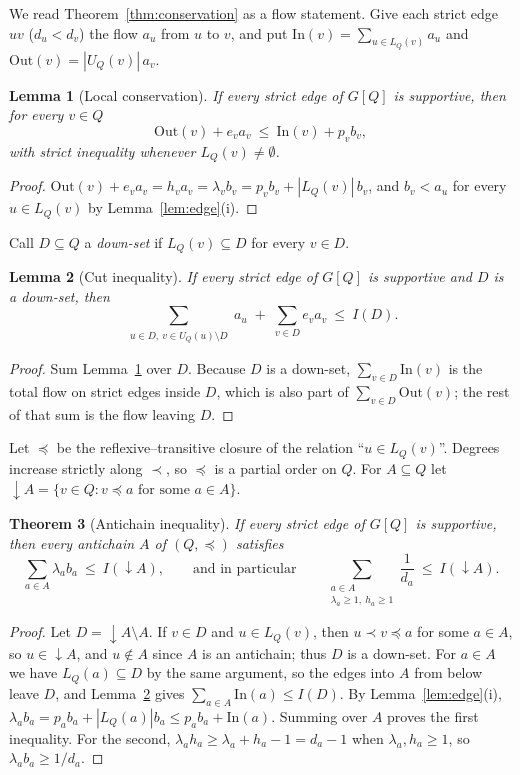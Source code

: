 \documentclass[11pt]{amsart}
\newtheorem{theorem}{Theorem}[section]
\newtheorem{lemma}[theorem]{Lemma}
\theoremstyle{definition}
\begin{document}
We read Theorem~\ref{thm:conservation} as a flow statement. Give each strict edge $uv$ ($d_u<d_v$) the flow $a_u$ from
$u$ to $v$, and put $\mathrm{In}(v)=\sum_{u\in L_Q(v)}a_u$ and $\mathrm{Out}(v)=|U_Q(v)|\,a_v$.

\begin{lemma}[Local conservation]\label{lem:flow}
If every strict edge of $G[Q]$ is supportive, then for every $v\in Q$
\[
\mathrm{Out}(v)+e_va_v\ \le\ \mathrm{In}(v)+p_vb_v ,
\]
with strict inequality whenever $L_Q(v)\ne\emptyset$.
\end{lemma}

\begin{proof}
$\mathrm{Out}(v)+e_va_v=h_va_v=\lambda_vb_v=p_vb_v+|L_Q(v)|\,b_v$, and $b_v<a_u$ for every $u\in L_Q(v)$ by
Lemma~\ref{lem:edge}(i).
\end{proof}

Call $D\subseteq Q$ a \emph{down-set} if $L_Q(v)\subseteq D$ for every $v\in D$.

\begin{lemma}[Cut inequality]\label{lem:cut}
If every strict edge of $G[Q]$ is supportive and $D$ is a down-set, then
\[
\sum_{\substack{u\in D,\ v\in U_Q(u)\setminus D}}a_u\;+\;\sum_{v\in D}e_va_v\ \le\ I(D).
\]
\end{lemma}

\begin{proof}
Sum Lemma~\ref{lem:flow} over $D$. Because $D$ is a down-set, $\sum_{v\in D}\mathrm{In}(v)$ is the total flow on
strict edges inside $D$, which is also part of $\sum_{v\in D}\mathrm{Out}(v)$; the rest of that sum is the flow leaving $D$.
\end{proof}

Let $\preceq$ be the reflexive--transitive closure of the relation ``$u\in L_Q(v)$''. Degrees increase strictly along
$\prec$, so $\preceq$ is a partial order on $Q$. For $A\subseteq Q$ let $\downarrow\!A=\{v\in Q: v\preceq a\text{ for some }a\in A\}$.

\begin{theorem}[Antichain inequality]\label{thm:antichain}
If every strict edge of $G[Q]$ is supportive, then every antichain $A$ of $(Q,\preceq)$ satisfies
\[
\sum_{a\in A}\lambda_a b_a\ \le\ I(\downarrow\!A),\qquad\text{and in particular}\qquad
\sum_{\substack{a\in A\\ \lambda_a\ge1,\ h_a\ge1}}\frac1{d_a}\ \le\ I(\downarrow\!A).
\]
\end{theorem}

\begin{proof}
Let $D=\downarrow\!A\setminus A$. If $v\in D$ and $u\in L_Q(v)$, then $u\prec v\preceq a$ for some $a\in A$, so
$u\in\downarrow\!A$, and $u\notin A$ since $A$ is an antichain; thus $D$ is a down-set. For $a\in A$ we have
$L_Q(a)\subseteq D$ by the same argument, so the edges into $A$ from below leave $D$, and Lemma~\ref{lem:cut} gives
$\sum_{a\in A}\mathrm{In}(a)\le I(D)$. By Lemma~\ref{lem:edge}(i),
$\lambda_ab_a=p_ab_a+|L_Q(a)|b_a\le p_ab_a+\mathrm{In}(a)$. Summing over $A$ proves the first inequality. For the second,
$\lambda_ah_a\ge\lambda_a+h_a-1=d_a-1$ when $\lambda_a,h_a\ge1$, so $\lambda_ab_a\ge 1/d_a$.
\end{proof}
\end{document}
